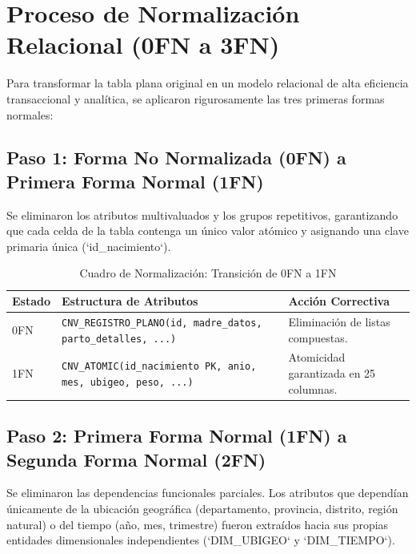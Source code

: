 \documentclass[12pt,a4paper]{article}
\begin{document}
\newpage

\section{Proceso de Normalización Relacional (0FN a 3FN)}

Para transformar la tabla plana original en un modelo relacional de alta eficiencia transaccional y analítica, se aplicaron rigurosamente las tres primeras formas normales:

\subsection{Paso 1: Forma No Normalizada (0FN) a Primera Forma Normal (1FN)}
Se eliminaron los atributos multivaluados y los grupos repetitivos, garantizando que cada celda de la tabla contenga un único valor atómico y asignando una clave primaria única (`id_nacimiento`).

\begin{table}[H]
\centering
\footnotesize
\caption{Cuadro de Normalización: Transición de 0FN a 1FN}
\begin{tabular}{lll}
\toprule
\textbf{Estado} & \textbf{Estructura de Atributos} & \textbf{Acción Correctiva} \\
\midrule
0FN & \texttt{CNV\_REGISTRO\_PLANO(id, madre\_datos, parto\_detalles, ...)} & Eliminación de listas compuestas. \\
1FN & \texttt{CNV\_ATOMIC(id\_nacimiento PK, anio, mes, ubigeo, peso, ...)} & Atomicidad garantizada en 25 columnas. \\
\bottomrule
\end{tabular}
\end{table}

\subsection{Paso 2: Primera Forma Normal (1FN) a Segunda Forma Normal (2FN)}
Se eliminaron las dependencias funcionales parciales. Los atributos que dependían únicamente de la ubicación geográfica (departamento, provincia, distrito, región natural) o del tiempo (año, mes, trimestre) fueron extraídos hacia sus propias entidades dimensionales independientes (`DIM_UBIGEO` y `DIM_TIEMPO`).
\end{document}
